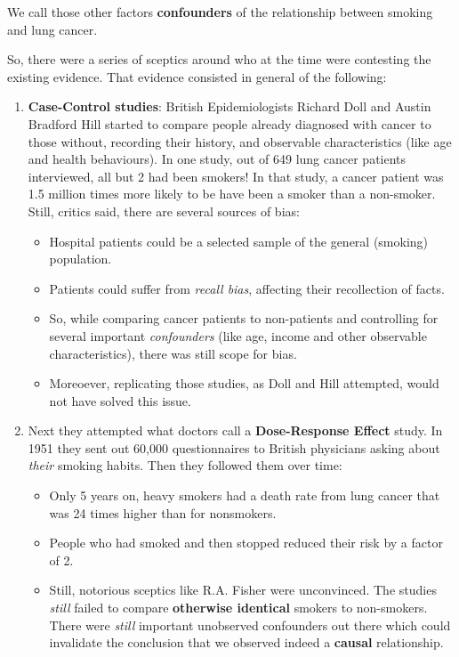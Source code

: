 \documentclass[]{book}
\providecommand{\tightlist}{%
  \setlength{\itemsep}{0pt}\setlength{\parskip}{0pt}}
\begin{document}
We call those other factors \textbf{confounders} of the relationship
between smoking and lung cancer.

So, there were a series of sceptics around who at the time were
contesting the existing evidence. That evidence consisted in general of
the following:

\begin{enumerate}
\def\labelenumi{\arabic{enumi}.}
\tightlist
\item
  \textbf{Case-Control studies}: British Epidemiologists Richard Doll
  and Austin Bradford Hill started to compare people already diagnosed
  with cancer to those without, recording their history, and observable
  characteristics (like age and health behaviours). In one study, out of
  649 lung cancer patients interviewed, all but 2 had been smokers! In
  that study, a cancer patient was 1.5 million times more likely to be
  have been a smoker than a non-smoker. Still, critics said, there are
  several sources of bias:

  \begin{itemize}
  \tightlist
  \item
    Hospital patients could be a selected sample of the general
    (smoking) population.
  \item
    Patients could suffer from \emph{recall bias}, affecting their
    recollection of facts.
  \item
    So, while comparing cancer patients to non-patients and controlling
    for several important \emph{confounders} (like age, income and other
    observable characteristics), there was still scope for bias.
  \item
    Moreoever, replicating those studies, as Doll and Hill attempted,
    would not have solved this issue.
  \end{itemize}
\item
  Next they attempted what doctors call a \textbf{Dose-Response Effect}
  study. In 1951 they sent out 60,000 questionnaires to British
  physicians asking about \emph{their} smoking habits. Then they
  followed them over time:

  \begin{itemize}
  \tightlist
  \item
    Only 5 years on, heavy smokers had a death rate from lung cancer
    that was 24 times higher than for nonsmokers.
  \item
    People who had smoked and then stopped reduced their risk by a
    factor of 2.
  \item
    Still, notorious sceptics like R.A. Fisher were unconvinced. The
    studies \emph{still} failed to compare \textbf{otherwise identical}
    smokers to non-smokers. There were \emph{still} important unobserved
    confounders out there which could invalidate the conclusion that we
    observed indeed a \textbf{causal} relationship.
  \end{itemize}
\end{enumerate}
\end{document}

